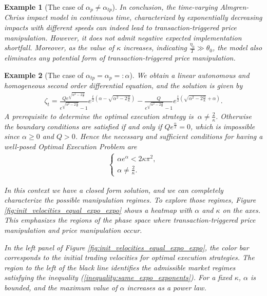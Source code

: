 \documentclass[final,3p,authoryear,12pt]{elsarticle}
\newtheorem{example}{Example}
\begin{document}
\begin{example}[The case of $\alpha_{p}\neq \alpha_{tp}$]
In conclusion, the time-varying Almgren-Chriss impact model in continuous time, characterized by exponentially decreasing impacts with different speeds can indeed lead to transaction-triggered price manipulation. However, it does not admit negative expected implementation shortfall. Moreover, as the value of $\kappa$ increases, indicating $\frac{\eta_{0}}{T}\gg\theta_{0}$, the model also eliminates any potential form of transaction-triggered price manipulation.%
\end{example}

\begin{example}[The case of $\alpha_{tp}=\alpha_{p}=:\alpha$]
We obtain a linear autonomous and homogeneous second order differential equation, and the solution is given by
\begin{align}
    \zeta_{t} = \frac{Q e^{\sqrt{\alpha^2 -2 \frac{\alpha}{\kappa}}}}{e^{\sqrt{\alpha^2 -2 \frac{\alpha}{\kappa}}}-1} e^{\frac{t}{2} \left(\alpha-\sqrt{\alpha^2-2\frac{\alpha}{\kappa}}\right)}-\frac{Q}{e^{\sqrt{\alpha^2 -2 \frac{\alpha}{\kappa}}}-1} e^{\frac{t}{2} \left(\sqrt{\alpha^2-2\frac{\alpha}{\kappa}}+\alpha\right)}.
\end{align}
A prerequisite to determine the optimal execution strategy is \( \ \alpha \neq \frac{2}{\kappa} \). Otherwise the boundary conditions are satisfied if and only if $Qe^{\frac{\alpha}{2}}=0$, which is impossible since $\alpha \ge 0$ and $Q>0$. Hence the necessary and sufficient conditions for having a well-posed Optimal Execution Problem are  
\begin{align}
\label{inequality:same_expo_exponents}
    \begin{cases}
        \alpha e^{\alpha} < 2\kappa \pi^{2}, \\
        \alpha \neq \frac{2}{\kappa}.
    \end{cases}
\end{align}

In this context we have a closed form solution, and  we can completely characterize the possible manipulation regimes. To explore those regimes, Figure \ref{fig:init_velocities_equal_expo_expo} shows a heatmap with \(\alpha\) and $\kappa$ on the axes. This emphasizes the regions of the phase space where transaction-triggered price manipulation and price manipulation occur.

In the left panel of Figure \ref{fig:init_velocities_equal_expo_expo}, the color bar corresponds to the initial trading velocities for optimal execution strategies. The region to the left of the black line identifies the admissible market regimes satisfying the inequality (\ref{inequality:same_expo_exponents}). For a fixed $\kappa$, $\alpha$ is bounded, and the maximum value of $\alpha$ increases as a power law.


\end{example}
\end{document}
